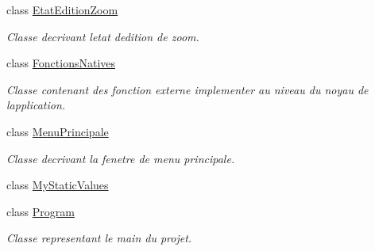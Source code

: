 \begin{DoxyCompactItemize}
class \hyperlink{class_interface_graphique_1_1_etat_edition_zoom}{Etat\+Edition\+Zoom}
\begin{DoxyCompactList}\small\item\em Classe decrivant l\textquotesingle{}etat d\textquotesingle{}edition de zoom. \end{DoxyCompactList}\item 
class \hyperlink{class_interface_graphique_1_1_fonctions_natives}{Fonctions\+Natives}
\begin{DoxyCompactList}\small\item\em Classe contenant des fonction externe implementer au niveau du noyau de l\textquotesingle{}application. \end{DoxyCompactList}\item 
class \hyperlink{class_interface_graphique_1_1_menu_principale}{Menu\+Principale}
\begin{DoxyCompactList}\small\item\em Classe decrivant la fenetre de menu principale. \end{DoxyCompactList}\item 
class \hyperlink{class_interface_graphique_1_1_my_static_values}{My\+Static\+Values}
\item 
class \hyperlink{class_interface_graphique_1_1_program}{Program}
\begin{DoxyCompactList}\small\item\em Classe representant le main du projet. \end{DoxyCompactList}\end{DoxyCompactItemize}

